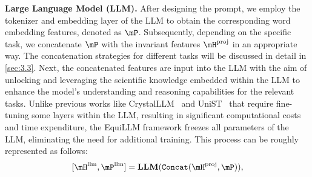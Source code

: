 \textbf{Large Language Model (LLM).} After designing the prompt, we employ the tokenizer and embedding layer of the LLM to obtain the corresponding word embedding features, denoted as $\mP$. Subsequently, depending on the specific task, we concatenate $\mP$ with the invariant features $\mH^{\text{proj}}$ in an appropriate way. The concatenation strategies for different tasks will be discussed in detail in \cref{sec:3.3}. Next, the concatenated features are input into the LLM with the aim of unlocking and leveraging the scientific knowledge embedded within the LLM to enhance the model's understanding and reasoning capabilities for the relevant tasks. Unlike previous works like CrystalLLM~\citep{gruver2024finetuned} and UniST~\citep{yuan2024unist} that require fine-tuning some layers within the LLM, resulting in significant computational costs and time expenditure, the EquiLLM framework freezes all parameters of the LLM, eliminating the need for additional training. This process can be roughly represented as follows:
\begin{equation}\label{eq:llm}
\begin{aligned}
    &[\mH^{\text{llm}}, \mP^{\text{llm}}] = \mathbf{LLM} (\texttt{Concat} (\mH^{\text{proj}}, \mP)), \\
\end{aligned}
\end{equation}

